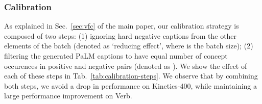 \begin{table}
    \setlength{\tabcolsep}{6pt}
    \centering
     \vspace{0.2cm}
    \caption{
    \textbf{Fine-tuning image and text towers.} We report multi-choice accuracy on Verb~\cite{park-etal-2022-exposing} and Kinetics-400 top-1 accuracy. \SnowflakeChevron corresponds to freezing the image or text tower. We observe that fine-tuning both image and text towers works best. For experiments including hard negatives, we note that one hard negative is sampled for each video here.}
    \label{tab:finetuning-image-text}
\end{table}

\subsubsection{Calibration}\label{subsec:calibration-ablation}
As explained in Sec.~\ref{sec:vfc} of the main paper, our calibration strategy is composed of two steps: (1) ignoring hard negative captions from the other elements of the batch (denoted as `reducing  effect', where  is the batch size); (2) filtering the generated PaLM captions to have equal number of concept occurences in positive and negative pairs (denoted as ). We show the effect of each of these steps in Tab.~\ref{tab:calibration-steps}. We observe that by combining both steps, we avoid a drop in performance on Kinetics-400, while maintaining a large performance improvement on Verb.


